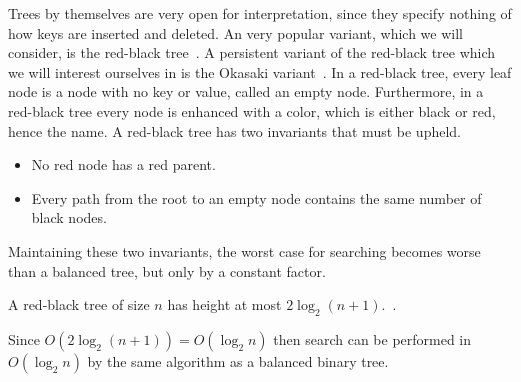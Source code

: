 Trees by themselves are very open for interpretation, since they specify nothing of how keys are inserted and deleted.
An very popular variant, which we will consider, is the red-black tree~\cite{bayer1972symmetric}.
A persistent variant of the red-black tree which we will interest ourselves in is the Okasaki variant~\cite{okasaki1999red}.
In a red-black tree, every leaf node is a node with no key or value, called an empty node.
Furthermore, in a red-black tree every node is enhanced with a color, which is either black or red, hence the name.
A red-black tree has two invariants that must be upheld.
\begin{itemize}
	\item No red node has a red parent.
	\item Every path from the root to an empty node contains the same number of black nodes.
\end{itemize}
Maintaining these two invariants, the worst case for searching becomes worse than a balanced tree, but only by a constant factor.
\begin{lemma}
	A red-black tree of size $n$ has height at most $2 \log_2 (n + 1)$.~\cite{cormen2009introduction}.
\end{lemma}
Since $O(2 \log_2 (n + 1)) = O(\log_2 n)$ then search can be performed in $O(\log_2 n)$ by the same algorithm as a balanced binary tree.

